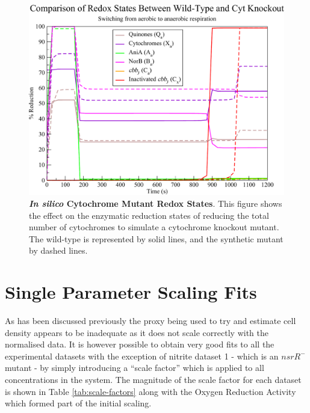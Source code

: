 \begin{figure}[tbp]
 \centering
 \includegraphics[width=15cm, clip=true]{./09-completedmodel/data/in_silico_cyt_redox.pdf}
 \caption[In Silico Cytochrome Mutant Redox States]{{\bf \textit{In silico} Cytochrome Mutant Redox States}. This figure shows the effect on the enzymatic reduction states of reducing the total number of cytochromes to simulate a cytochrome knockout mutant. The wild-type is represented by solid lines, and the synthetic mutant by dashed lines.
 \label{fig:in_silico_cyt_redox}}
\end{figure}

%

\section{Single Parameter Scaling Fits}
As has been discussed previously the proxy being used to try and estimate cell density appears to be inadequate as it does not scale correctly with the normalised data. It is however possible to obtain very good fits to all the experimental datasets with the exception of nitrite dataset 1 -  which is an $nsrR^-$ mutant - by simply introducing a ``scale factor'' which is applied to all concentrations in the system. The magnitude of the scale factor for each dataset is shown in Table \ref{tab:scale-factors} along with the Oxygen Reduction Activity which formed part of the initial scaling.


